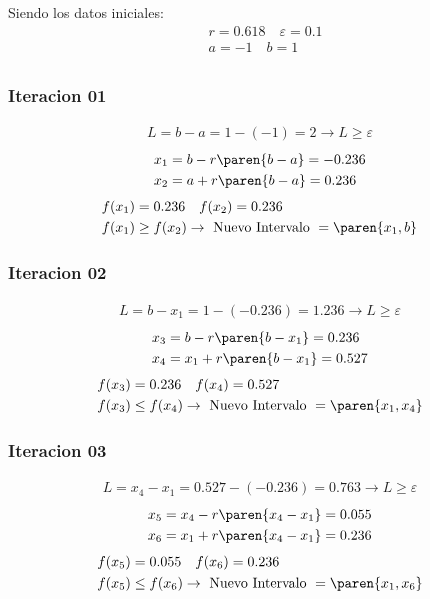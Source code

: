 \begin{homeworkProblem}
Siendo los datos iniciales:
\begin{align*}
    &r=0.618\quad \varepsilon = 0.1 \\
    &a=-1\quad  b=1\\
\end{align*}

\subsubsection{Iteracion 01}
\begin{align*}
    L=b-a=1-(-1)=2 \rightarrow L \geq \varepsilon
\end{align*}
\begin{align*}
    &x_1=b - r\paren{b-a}= -0.236 \\
    &x_2=a + r\paren{b-a}= 0.236 
\end{align*}
\begin{align*}
    &f(x_1)=0.236 \quad f(x_2)=0.236 \\
    &f(x_1) \geq f(x_2) \rightarrow \text{ Nuevo Intervalo } = \paren{x_1,b}
\end{align*}


\subsubsection{Iteracion 02}
\begin{align*}
    L=b-x_1=1-(-0.236)=1.236 \rightarrow L \geq \varepsilon
\end{align*}
\begin{align*}
    &x_3=b - r\paren{b-x_1}= 0.236\\
    &x_4=x_1 + r\paren{b-x_1}= 0.527
\end{align*}
\begin{align*}
    &f(x_3)=0.236 \quad f(x_4)=0.527 \\
    &f(x_3) \leq f(x_4) \rightarrow \text{ Nuevo Intervalo } = \paren{x_1,x_4}
\end{align*}


\subsubsection{Iteracion 03}
\begin{align*}
    L=x_4-x_1=0.527-(-0.236)=0.763 \rightarrow L \geq \varepsilon
\end{align*}
\begin{align*}
    &x_5=x_4 - r\paren{x_4-x_1}= 0.055 \\
    &x_6=x_1 + r\paren{x_4-x_1}= 0.236
\end{align*}
\begin{align*}
    &f(x_5)=0.055 \quad f(x_6)=0.236 \\
    &f(x_5) \leq f(x_6) \rightarrow \text{ Nuevo Intervalo } = \paren{x_1,x_6}
\end{align*}


\end{homeworkProblem}
